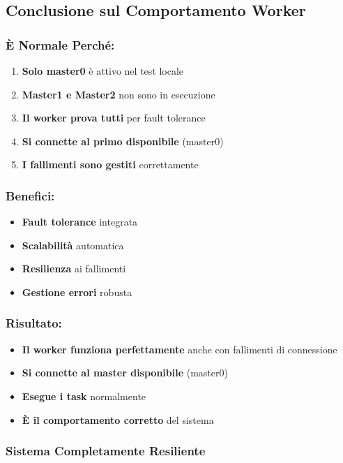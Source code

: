 \documentclass[12pt,a4paper]{article}
\begin{document}
\subsection{Conclusione sul Comportamento Worker}

\subsubsection{È Normale Perché:}

\begin{enumerate}
\item \textbf{Solo master0} è attivo nel test locale
\item \textbf{Master1 e Master2} non sono in esecuzione
\item \textbf{Il worker prova tutti} per fault tolerance
\item \textbf{Si connette al primo disponibile} (master0)
\item \textbf{I fallimenti sono gestiti} correttamente
\end{enumerate}

\subsubsection{Benefici:}

\begin{itemize}
\item \textbf{Fault tolerance} integrata
\item \textbf{Scalabilità} automatica
\item \textbf{Resilienza} ai fallimenti
\item \textbf{Gestione errori} robusta
\end{itemize}

\subsubsection{Risultato:}

\begin{itemize}
\item \textbf{Il worker funziona perfettamente} anche con fallimenti di connessione
\item \textbf{Si connette al master disponibile} (master0)
\item \textbf{Esegue i task} normalmente
\item \textbf{È il comportamento corretto} del sistema
\end{itemize}

\subsubsection{Sistema Completamente Resiliente}
\end{document}
